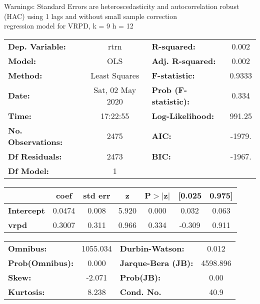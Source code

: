 Warnings: \newline
 [1] Standard Errors are heteroscedasticity and autocorrelation robust (HAC) using 1 lags and without small sample correction\\ 

regression model for VRPD, k = 9 h = 12\begin{center}
\begin{tabular}{lclc}
\toprule
\textbf{Dep. Variable:}    &       rtrn       & \textbf{  R-squared:         } &     0.002   \\
\textbf{Model:}            &       OLS        & \textbf{  Adj. R-squared:    } &     0.002   \\
\textbf{Method:}           &  Least Squares   & \textbf{  F-statistic:       } &    0.9333   \\
\textbf{Date:}             & Sat, 02 May 2020 & \textbf{  Prob (F-statistic):} &    0.334    \\
\textbf{Time:}             &     17:22:55     & \textbf{  Log-Likelihood:    } &    991.25   \\
\textbf{No. Observations:} &        2475      & \textbf{  AIC:               } &    -1979.   \\
\textbf{Df Residuals:}     &        2473      & \textbf{  BIC:               } &    -1967.   \\
\textbf{Df Model:}         &           1      & \textbf{                     } &             \\
\bottomrule
\end{tabular}
\begin{tabular}{lcccccc}
                   & \textbf{coef} & \textbf{std err} & \textbf{z} & \textbf{P$> |$z$|$} & \textbf{[0.025} & \textbf{0.975]}  \\
\midrule
\textbf{Intercept} &       0.0474  &        0.008     &     5.920  &         0.000        &        0.032    &        0.063     \\
\textbf{vrpd}      &       0.3007  &        0.311     &     0.966  &         0.334        &       -0.309    &        0.911     \\
\bottomrule
\end{tabular}
\begin{tabular}{lclc}
\textbf{Omnibus:}       & 1055.034 & \textbf{  Durbin-Watson:     } &    0.012  \\
\textbf{Prob(Omnibus):} &   0.000  & \textbf{  Jarque-Bera (JB):  } & 4598.896  \\
\textbf{Skew:}          &  -2.071  & \textbf{  Prob(JB):          } &     0.00  \\
\textbf{Kurtosis:}      &   8.238  & \textbf{  Cond. No.          } &     40.9  \\
\bottomrule
\end{tabular}
\end{center}

